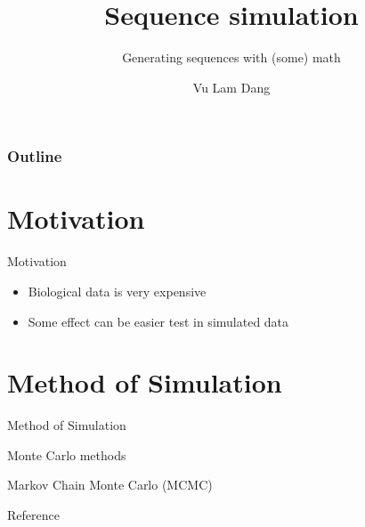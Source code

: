 \documentclass[
  ignorenonframetext,
  aspectratio=1610,
]{beamer}
\title{Sequence simulation}
\subtitle{Generating sequences with (some) math}
\author{Vu Lam Dang}
\date{}
\newif\ifbibliography
\providecommand{\tightlist}{%
  \setlength{\itemsep}{0pt}\setlength{\parskip}{0pt}}
\begin{document}
\frame{\titlepage}


\begin{frame}[t]

\frametitle{Outline}


\tableofcontents[hideallsubsections]

\vspace*{2em}




\end{frame}


\hypertarget{motivation}{%
\section{Motivation}\label{motivation}}

\begin{frame}{Motivation}
\begin{itemize}
\tightlist
\item
  Biological data is very expensive
\item
  Some effect can be easier test in simulated data
\end{itemize}
\end{frame}

\hypertarget{method-of-simulation}{%
\section{Method of Simulation}\label{method-of-simulation}}

\begin{frame}{Method of Simulation}
\cite{@bishop_pattern}
\end{frame}

\begin{frame}{Monte Carlo methods}
\protect\hypertarget{monte-carlo-methods}{}
\end{frame}

\begin{frame}{Markov Chain Monte Carlo (MCMC)}
\protect\hypertarget{markov-chain-monte-carlo-mcmc}{}
\end{frame}

\renewcommand\refname{Reference}
\begin{frame}[allowframebreaks]{Reference}
  \bibliographytrue
  
\end{frame}
\end{document}
